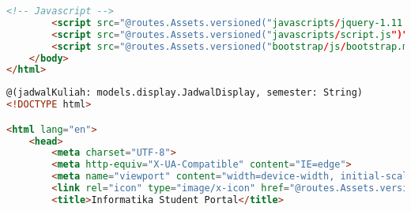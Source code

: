 \begin{lstlisting}[language=html,basicstyle=\tiny,caption=prasyarat.scala.html]
		<!-- Javascript -->
		<script src="@routes.Assets.versioned("javascripts/jquery-1.11.3.min.js")"></script>
		<script src="@routes.Assets.versioned("javascripts/script.js")"></script>
		<script src="@routes.Assets.versioned("bootstrap/js/bootstrap.min.js")"></script>
    </body>
</html>
\end{lstlisting}



\singlespacing 
\begin{lstlisting}[language=html,basicstyle=\tiny,caption=jadwalKuliah.scala.html]
@(jadwalKuliah: models.display.JadwalDisplay, semester: String)
<!DOCTYPE html>

<html lang="en">
    <head>
        <meta charset="UTF-8">
		<meta http-equiv="X-UA-Compatible" content="IE=edge">
        <meta name="viewport" content="width=device-width, initial-scale=1">
        <link rel="icon" type="image/x-icon" href="@routes.Assets.versioned("images/logo-IT.png")" />
		<title>Informatika Student Portal</title>


\end{lstlisting}

